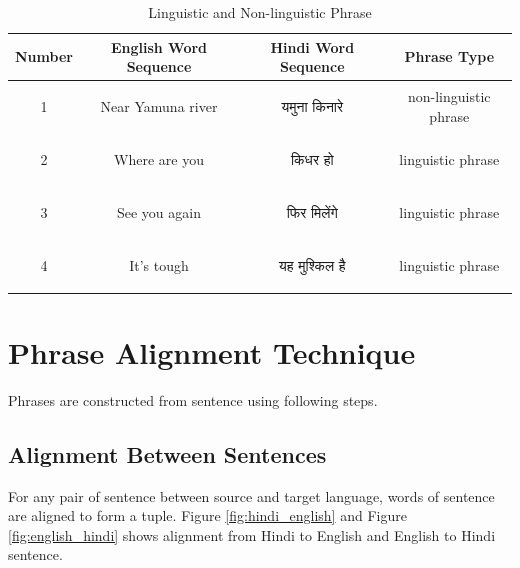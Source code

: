 \begin{table}[H]
\centering
	\caption{Linguistic and Non-linguistic Phrase}
    \label{table:phrase2}
	\begin{tabular}{c c c c}
    \hline
    Number & English Word Sequence & Hindi Word Sequence & Phrase Type\\
    \hline
    1 & Near Yamuna river & \begin{hindi} यमुना किनारे \end{hindi} & non-linguistic phrase\\
    2 & Where are you & \begin{hindi}किधर हो \end{hindi} & linguistic phrase \\
    3 & See you again & \begin{hindi} फिर मिलेंगे  \end{hindi} & linguistic phrase \\
    4 & It's tough & \begin{hindi} यह मुश्किल है   \end{hindi} & linguistic phrase\\
    \hline
	\end{tabular}
\end{table}

\section{Phrase Alignment Technique}
Phrases are constructed from sentence using following steps.
\subsection{Alignment Between Sentences}
For any pair of sentence between source and target language, words of sentence are aligned to form a tuple. Figure \ref{fig:hindi_english} and Figure \ref{fig:english_hindi} shows alignment from Hindi to English and English to Hindi sentence. 

